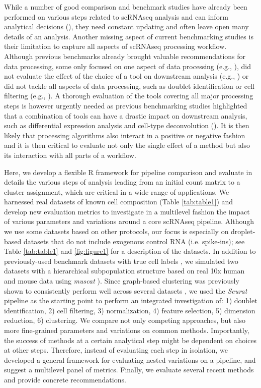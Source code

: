 \documentclass{bmcart}
\begin{document}
While a number of good comparison and benchmark studies have already been performed on various steps related to scRNAseq analysis and can inform analytical decisions (\citealp{duoClustering2018, SonesonDE2018, SunDimRed2019}), they need constant updating and often leave open many details of an analysis. Another missing aspect of current benchmarking studies is their limitation to capture all aspects of scRNAseq processing workflow. Although previous benchmarks already brought valuable recommendations for data processing, some only focused on one aspect of data processing (e.g., \citealp{SunDimRed2019}), did not evaluate the effect of the choice of a tool on downstream analysis (e.g., \citealp{TsuyuzakiPCA2020}) or did not tackle all aspects of data processing, such as doublet identification or cell filtering (e.g., \citealp{viethSystematic2019}). A thorough evaluation of the tools covering all major processing steps is however urgently needed as previous benchmarking studies highlighted that a combination of tools can have a drastic impact on downstream analysis, such as differential expression analysis and cell-type deconvolution (\citealp{viethSystematic2019, CobosDeconvolution2020}). It is then likely that processing algorithms also interact in a positive or negative fashion and it is then critical to evaluate not only the single effect of a method but also its interaction with all parts of a workflow. 

Here, we develop a flexible R framework for pipeline comparison and evaluate in details the various steps of analysis leading from an initial count matrix to a cluster assignment, which are critical in a wide range of applications. We harnessed real datasets of known cell composition (Table \ref{tab:table1}) and develop new evaluation metrics to investigate in a multilevel fashion the impact of various parameters and variations around a core scRNAseq pipeline. Although we use some datasets based on other protocols, our focus is especially on droplet-based datasets that do not include exogenous control RNA (i.e. spike-ins); see Table \ref{tab:table1} and \ref{fig:figure1} for a description of the datasets. In addition to previously-used benchmark datasets with true cell labels \cite{duoClustering2018,tianMixology2018}, we simulated two datasets with a hierarchical subpopulation structure based on real 10x human and mouse data using \textit{muscat} \cite{CrowellMuscat2019}). 
Since graph-based clustering \cite{satijaSeurat2015} was previously shown to consistently perform well across several datasets \cite{duoClustering2018,tianMixology2018}, we used the \textit{Seurat} pipeline as the starting point to perform an integrated investigation of: 1) doublet identification, 2) cell filtering, 3) normalization, 4) feature selection, 5) dimension reduction, 6) clustering. We compare not only competing approaches, but also more fine-grained parameters and variations on common methods. Importantly, the success of methods at a certain analytical step might be dependent on choices at other steps. Therefore, instead of evaluating each step in isolation, we developed a general framework for evaluating nested variations on a pipeline, and suggest a multilevel panel of metrics. Finally, we evaluate several recent methods and provide concrete recommendations.
\end{document}

